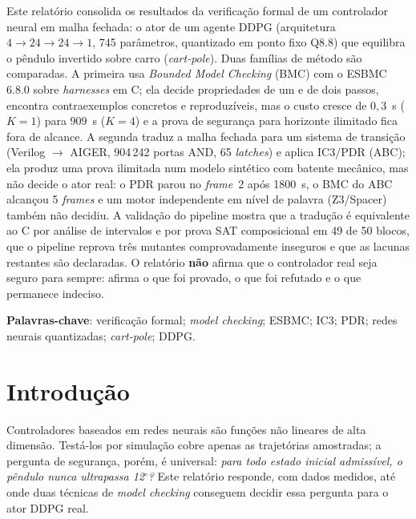 \documentclass[12pt,openright,oneside,a4paper,chapter=TITLE,sumario=tradicional,english,brazil]{abntex2}
\begin{document}
\begin{resumo}
Este relatório consolida os resultados da verificação formal de um controlador neural em malha fechada: o ator de um agente DDPG (arquitetura $4{\to}24{\to}24{\to}1$, 745 parâmetros, quantizado em ponto fixo Q8.8) que equilibra o pêndulo invertido sobre carro (\emph{cart-pole}). Duas famílias de método são comparadas. A primeira usa \emph{Bounded Model Checking} (BMC) com o ESBMC 6.8.0 sobre \emph{harnesses} em C; ela decide propriedades de um e de dois passos, encontra contraexemplos concretos e reproduzíveis, mas o custo cresce de $0{,}3$~s ($K{=}1$) para $909$~s ($K{=}4$) e a prova de segurança para horizonte ilimitado fica fora de alcance. A segunda traduz a malha fechada para um sistema de transição (Verilog $\to$ AIGER, 904\,242 portas AND, 65 \emph{latches}) e aplica IC3/PDR (ABC); ela produz uma prova ilimitada num modelo sintético com batente mecânico, mas não decide o ator real: o PDR parou no \emph{frame}~2 após 1800~s, o BMC do ABC alcançou 5 \emph{frames} e um motor independente em nível de palavra (Z3/Spacer) também não decidiu. A validação do pipeline mostra que a tradução é equivalente ao C por análise de intervalos e por prova SAT composicional em 49 de 50 blocos, que o pipeline reprova três mutantes comprovadamente inseguros e que as lacunas restantes são declaradas. O relatório \textbf{não} afirma que o controlador real seja seguro para sempre: afirma o que foi provado, o que foi refutado e o que permanece indeciso.

\vspace{\onelineskip}
\noindent\textbf{Palavras-chave}: verificação formal; \emph{model checking}; ESBMC; IC3; PDR; redes neurais quantizadas; \emph{cart-pole}; DDPG.
\end{resumo}

\tableofcontents*
\cleardoublepage
\listoffigures*
\cleardoublepage
\listoftables*
\cleardoublepage

\textual

\chapter{Introdução}

Controladores baseados em redes neurais são funções não lineares de alta dimensão. Testá-los por simulação cobre apenas as trajetórias amostradas; a pergunta de segurança, porém, é universal: \emph{para todo estado inicial admissível, o pêndulo nunca ultrapassa 12$^\circ$?} Este relatório responde, com dados medidos, até onde duas técnicas de \emph{model checking} conseguem decidir essa pergunta para o ator DDPG real.
\end{document}
